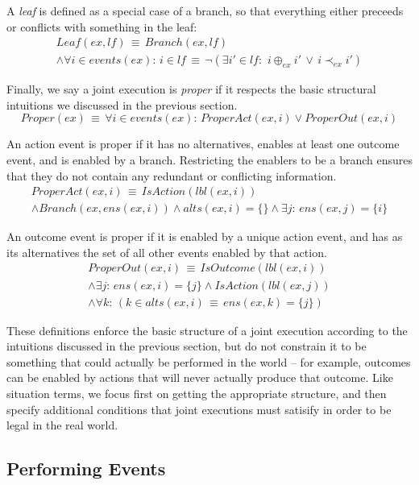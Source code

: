 A \emph{leaf} is defined as a special case of a branch, so that everything
either preceeds or conflicts with something in the leaf:\begin{multline*}
Leaf(ex,lf)\,\equiv\, Branch(ex,lf)\\
\wedge\forall i\in events(ex):\, i\in lf\,\equiv\,\neg(\exists i'\in lf:\,\, i\oplus_{ex}i'\,\vee\, i\prec_{ex}i')\end{multline*}


Finally, we say a joint execution is \emph{proper} if it respects
the basic structural intuitions we discussed in the previous section.\[
Proper(ex)\,\equiv\,\forall i\in events(ex):\, ProperAct(ex,i)\vee ProperOut(ex,i)\]


An action event is proper if it has no alternatives, enables at least
one outcome event, and is enabled by a branch. Restricting the enablers
to be a branch ensures that they do not contain any redundant or conflicting
information.\begin{gather*}
ProperAct(ex,i)\,\equiv\, IsAction(lbl(ex,i))\\
\wedge Branch(ex,ens(ex,i))\wedge alts(ex,i)=\{\}\wedge\exists j:\, ens(ex,j)=\{i\}\end{gather*}


An outcome event is proper if it is enabled by a unique action event,
and has as its alternatives the set of all other events enabled by
that action.\begin{gather*}
ProperOut(ex,i)\,\equiv\, IsOutcome(lbl(ex,i))\\
\wedge\exists j:\, ens(ex,i)=\{j\}\wedge IsAction(lbl(ex,j))\\
\wedge\forall k:\,\left(k\in alts(ex,i)\,\equiv\, ens(ex,k)=\{j\}\right)\end{gather*}


These definitions enforce the basic structure of a joint execution
according to the intuitions discussed in the previous section, but
do not constrain it to be something that could actually be performed
in the world -- for example, outcomes can be enabled by actions that
will never actually produce that outcome. Like situation terms, we
focus first on getting the appropriate structure, and then specify
additional conditions that joint executions must satisify in order
to be legal in the real world.


\subsection{Performing Events}

